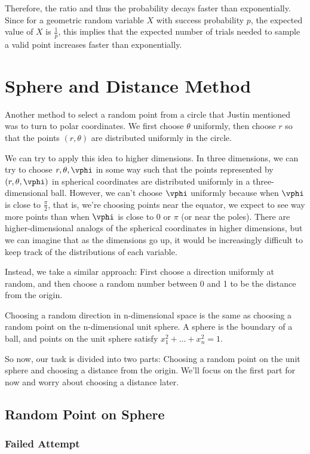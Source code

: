 \documentclass{article}
\begin{document}
Therefore, the ratio and thus the probability decays faster than exponentially. Since for a geometric random variable $X$ with success probability $p$, the expected value of $X$ is $\frac{1}{p}$, this implies that the expected number of trials needed to sample a valid point increases faster than exponentially.

\section{Sphere and Distance Method}

Another method to select a random point from a circle that Justin mentioned was to turn to polar coordinates. We first choose $\theta$ uniformly, then choose $r$ so that the points $(r, \theta)$ are distributed uniformly in the circle.

We can try to apply this idea to higher dimensions. In three dimensions, we can try to choose $r, \theta, \vphi$ in some way such that the points represented by $(r, \theta, \vphi)$ in spherical coordinates are distributed uniformly in a three-dimensional ball. However, we can't choose $\vphi$ uniformly because when $\vphi$ is close to $\frac{\pi}{2}$, that is, we're choosing points near the equator, we expect to see way more points than when $\vphi$ is close to 0 or $\pi$ (or near the poles). There are higher-dimensional analogs of the spherical coordinates in higher dimensions, but we can imagine that as the dimensions go up, it would be increasingly difficult to keep track of the distributions of each variable.

Instead, we take a similar approach: First choose a direction uniformly at random, and then choose a random number between 0 and 1 to be the distance from the origin.

Choosing a random direction in n-dimensional space is the same as choosing a random point on the n-dimensional unit sphere. A sphere is the boundary of a ball, and points on the unit sphere satisfy $x_1^2 + \ldots + x_n^2 = 1$.

So now, our task is divided into two parts: Choosing a random point on the unit sphere and choosing a distance from the origin. We'll focus on the first part for now and worry about choosing a distance later.

\subsection{Random Point on Sphere}

\subsubsection{Failed Attempt}
\end{document}
